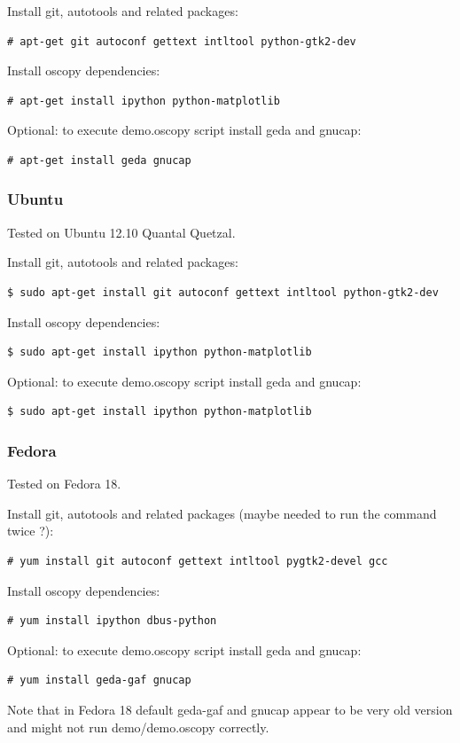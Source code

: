 \documentclass[a4paper,11pt]{report}
\begin{document}
Install git, autotools and related packages:
\begin{lstlisting}
# apt-get git autoconf gettext intltool python-gtk2-dev
\end{lstlisting}
Install oscopy dependencies:
\begin{lstlisting}
# apt-get install ipython python-matplotlib
\end{lstlisting}
Optional: to execute demo.oscopy script install geda and gnucap:
\begin{lstlisting}
# apt-get install geda gnucap
\end{lstlisting}

\subsubsection{Ubuntu}
Tested on Ubuntu 12.10 Quantal Quetzal.

Install git, autotools and related packages:
\begin{lstlisting}
$ sudo apt-get install git autoconf gettext intltool python-gtk2-dev
\end{lstlisting} %
Install oscopy dependencies:
\begin{lstlisting}
$ sudo apt-get install ipython python-matplotlib
\end{lstlisting} %
Optional: to execute demo.oscopy script install geda and gnucap:
\begin{lstlisting}
$ sudo apt-get install ipython python-matplotlib
\end{lstlisting} %

\subsubsection{Fedora}
Tested on Fedora 18.

Install git, autotools and related packages (maybe needed to run the command twice ?):
\begin{lstlisting}
# yum install git autoconf gettext intltool pygtk2-devel gcc
\end{lstlisting}
Install oscopy dependencies:
\begin{lstlisting}
# yum install ipython dbus-python 
\end{lstlisting}
Optional: to execute demo.oscopy script install geda and gnucap:
\begin{lstlisting}
# yum install geda-gaf gnucap 
\end{lstlisting}
Note that in Fedora 18 default geda-gaf and gnucap appear to be very old version and might not run demo/demo.oscopy correctly. 
\end{document}

